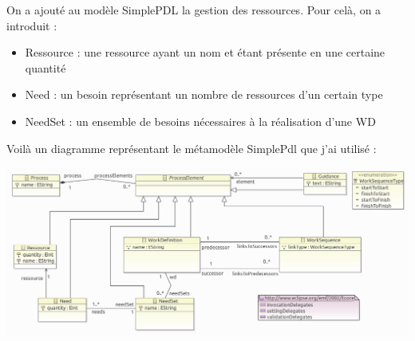 On a ajouté au modèle SimplePDL la gestion des ressources.
Pour celà, on a introduit :
\begin{itemize}
\item Ressource : une ressource ayant un nom et étant présente en une certaine quantité
\item Need : un besoin représentant un nombre de ressources d'un certain type
\item NeedSet : un ensemble de besoins nécessaires à la réalisation d'une WD
\end{itemize}

\vspace{1em}
Voilà un diagramme représentant le métamodèle SimplePdl que j'ai utilisé :
\begin{center}
\includegraphics[width=\textwidth]{../Images/model_pdl.png}
\end{center}
